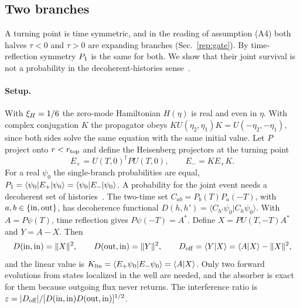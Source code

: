\subsection{Two branches}
\label{sec:rb-branches}

A turning point is time symmetric, and in the reading of assumption (A4) both halves $\tau<0$ and $\tau>0$ are expanding branches (Sec.~\ref{rep:gate}).
By time-reflection symmetry $P_1$ is the same for both.
We show that their joint survival is not a probability in the decoherent-histories sense~\cite{Gell-Mann:1991kdm,Goldstein:1994cp}.

\paragraph{Setup.}
With $\xi_H=1/6$ the zero-mode Hamiltonian $H(\eta)$ is real and even in $\eta$.
With complex conjugation $K$ the propagator obeys $KU(\eta_2,\eta_1)K=U(-\eta_2,-\eta_1)$, since both sides solve the same equation with the same initial value.
Let $P$ project onto $r<r_{\rm top}$ and define the Heisenberg projectors at the turning point
\begin{equation}
E_+=U(T,0)^\dagger PU(T,0),\qquad E_-=KE_+K .
\label{eq:rb-Epm}
\end{equation}
For a real $\psi_0$ the single-branch probabilities are equal, $P_1=\langle\psi_0|E_+|\psi_0\rangle=\langle\psi_0|E_-|\psi_0\rangle$.
A probability for the joint event needs a decoherent set of histories~\cite{Gell-Mann:1991kdm}.
The two-time set $C_{ab}=P_b(T)P_a(-T)$, with $a,b\in\{{\rm in},{\rm out}\}$, has decoherence functional $D(h,h')=\langle C_{h'}\psi_0|C_h\psi_0\rangle$.
With $A=P\psi(T)$, time reflection gives $P\psi(-T)=A^*$.
Define $X=PU(T,-T)A^*$ and $Y=A-X$.
Then
\begin{equation}
D({\rm in},{\rm in})=\|X\|^2,\qquad D({\rm out},{\rm in})=\|Y\|^2,\qquad
D_{\rm off}=\langle Y|X\rangle=\langle A|X\rangle-\|X\|^2,
\label{eq:rb-decoh}
\end{equation}
and the linear value is $K_{\rm lin}=\langle E_+\psi_0|E_-\psi_0\rangle=\langle A|X\rangle$.
Only two forward evolutions from states localized in the well are needed, and the absorber is exact for them because outgoing flux never returns.
The interference ratio is $\varepsilon=|D_{\rm off}|/[D({\rm in},{\rm in})D({\rm out},{\rm in})]^{1/2}$.

